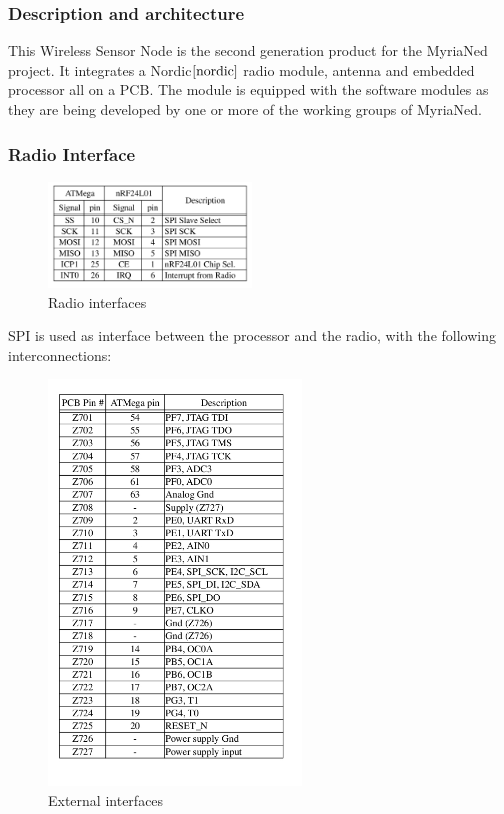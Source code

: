 \documentclass[a4paper,10pt]{report}
\begin{document}
\subsubsection{Description and architecture}
This Wireless Sensor Node is the second generation product for the MyriaNed project. It integrates a Nordic$\cite{nordic}$ radio module, antenna and embedded processor all on a PCB. The module is equipped with the software modules as they are being developed by one or more of the working groups of MyriaNed.
\subsubsection{Radio Interface}
\begin{figure}
\vspace{-30pt}
  \begin{center}
    \includegraphics[width=0.48\textwidth]{table1}
  \end{center}
  \caption{Radio interfaces}
  \label{table1}
\end{figure}
SPI is used as interface between the processor and the radio, with the following interconnections:
\begin{figure}
 \centering
    \includegraphics[width=0.6\textwidth]{table2}
  \caption{External interfaces}
  \label{table2}
\end{figure}
\end{document}
